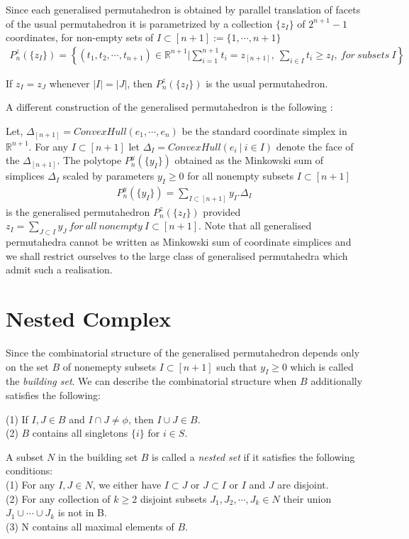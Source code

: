 \documentclass[hidelinks,12pt]{article}
\newcommand{\bea}[1]{\begin{eqnarray}\label{#1} }
\newcommand{\eea}{\end{eqnarray}}
\def\bea{\begin{eqnarray}}
\def\eea{\end{eqnarray}}
\begin{document}
 Since each generalised permutahedron is obtained by parallel translation of facets of the usual permutahedron it is parametrized  by a collection $\{ z_I\}$ of $2^{n+1}-1$ coordinates, for non-empty sets of $I \subset [n+1] := \{1,\cdots,n+1 \}$
 \bea
 P_n^z(\{ z_I \}) = \left \{ (t_1, t_2, \cdots , t_{n+1}) \in \mathbb{R}^{n+1} | \sum_{i=1}^{n+1} t_i = z_{[n+1]},~ \sum_{i \in I} t_i \geq z_I, ~for ~subsets~ I  \right  \} \nonumber
 \eea
 
 If $z_I =z_J$ whenever $|I| =|J|$, then  $ P_n^z(\{ z_I \})$ is the usual permutahedron.
 
 
 A different construction of the generalised permutahedron is the following :
 
 Let, $\Delta_{[n+1]} = ConvexHull(e_1,\cdots,e_n)$ be the standard coordinate simplex in $\mathbb{R}^{n+1}$. For any $I \subset [n+1] $ let $\Delta_I =ConvexHull(e_i~|~i\in I)$ denote the face of the $\Delta_{[n+1]}$. The polytope $P_n^y(\{y_I \})$ obtained as the Minkowski sum of simplices $\Delta_I$ scaled by  parameters $y_I \geq 0$ for all nonempty subsets $I \subset [n+1]$
 \bea
 P_n^y(\{y_I \})= \sum_{I \subset[n+1]} y_I . \Delta_I  \nonumber
 \eea
is the generalised permutahedron $P_n^z(\{z_I \})$  provided $z_I = \sum_{J \subset I} y_J  ~ for ~all~nonempty ~I \subset [n+1]$.
Note that all generalised permutahedra cannot be written as Minkowski sum of coordinate simplices and we shall restrict ourselves to the large class of generalised permutahedra which admit such a realisation.
\section*{Nested Complex}
Since the combinatorial structure of the generalised permutahedron depends only on the set $B$ of nonemepty subsets $I \subset [n+1]$ such that $y_I \geq 0$ which is called the {\it building set}. We can describe the combinatorial structure when $B$ additionally satisfies the following:

\noindent(1) If $I,J \in B$ and $I \cap J \neq \phi $, then $I \cup J \in B$. \\
(2) $B$ contains all singletons $\{ i\}$ for $i \in S$.

A subset $N$ in the building set $B$ is called a {\it nested set} if it satisfies the following conditions:\\
\noindent
(1) For any $I,J \in N$, we either have $I \subset J$ or $J\subset I$ or $I$ and $J$ are disjoint.\\
(2) For any collection of $k \geq 2$ disjoint subsets $J_1,J_2,\cdots, J_k \in N$ their union $J_1 \cup \cdots \cup J_k$ is not in B. \\
(3) N contains all maximal elements of $B$.
\end{document}
